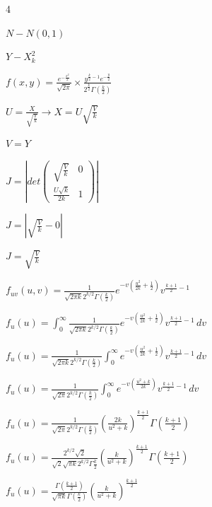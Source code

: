 \documentclass[12 pt]{article}
\begin{document}
    \begin{exercise}{4}
    \hfill

    $N - N(0,1)$

    $Y - X_k^2$

    $f(x,y) = \frac{e^{-\frac{x^2}{2}}}{\sqrt{2 \pi}} \times \frac{y^{\frac{k}{2}-1}e^{-\frac{y}{2}}}{2^{\frac{k}{2}}\Gamma(\frac{k}{2})}$

    \hfill

    $U = \frac{X}{\sqrt{\frac{Y}{k}}} \xrightarrow{} X = U\sqrt{\frac{V}{k}}$

    $V=Y$

    $J = |det\begin{pmatrix}
       \sqrt{\frac{V}{k}} & 0 \\
       \frac{U\sqrt{k}}{2k} & 1
    \end{pmatrix}|$

    $J = |\sqrt{\frac{V}{k}}-0|$

    $J= \sqrt{\frac{V}{k}}$

    \hfill

    $f_{uv}(u,v) = \frac{1}{\sqrt{2 \pi k} 2^{k/2} \Gamma(\frac{k}{2})} e^{-v(\frac{u^2}{2k}+\frac{1}{2})} v^{\frac{k+1}{2}- 1}$

    \hfill

    $f_u(u) = \int_{0}^{\infty} \frac{1}{\sqrt{2 \pi k} 2^{k/2} \Gamma(\frac{k}{2})} e^{-v(\frac{u^2}{2k}+\frac{1}{2})} v^{\frac{k+1}{2}- 1} \, dv$

    $f_u(u) = \frac{1}{\sqrt{2 \pi k} 2^{k/2} \Gamma(\frac{k}{2})} \int_{0}^{\infty} e^{-v(\frac{u^2}{2k}+\frac{1}{2})} v^{\frac{k+1}{2}- 1} \, dv$

    $f_u(u) = \frac{1}{\sqrt{2 \pi} 2^{k/2} \Gamma(\frac{k}{2})} \int_{0}^{\infty} e^{-v(\frac{u^2+k}{2k})} v^{\frac{k+1}{2}-1} \, dv$

    $f_u(u) = \frac{1}{\sqrt{2 \pi} 2^{k/2} \Gamma(\frac{k}{2})} (\frac{2k}{u^2+k})^{\frac{k+1}{2}} \Gamma(\frac{k+1}{2})$

    $f_u(u) = \frac{2^{k/2}\sqrt{2}}{\sqrt{2}\sqrt{\pi k}2^{k/2} \Gamma{\frac{k}{2}}} (\frac{k}{u^2+k})^{\frac{k+1}{2}} \Gamma(\frac{k+1}{2})$

    $f_u(u) = \frac{\Gamma(\frac{k+1}{2})}{\sqrt{\pi k} \Gamma(\frac{k}{2})}(\frac{k}{u^2 + k})^{\frac{k+1}{2}}$

    \hfill   
    \end{exercise}
\end{document}

